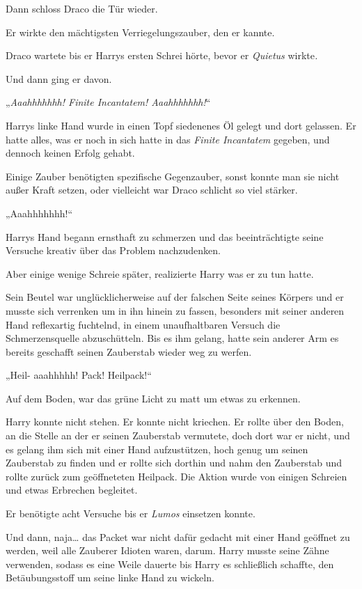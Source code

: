 {Dann schloss Draco die Tür wieder.

Er wirkte den mächtigsten Verriegelungszauber, den er kannte.

Draco wartete bis er Harrys ersten Schrei hörte, bevor er \emph{Quietus} wirkte\emph{.}

Und dann ging er davon.

„\emph{Aaahhhhhhh! Finite Incantatem! Aaahhhhhhh!}“

Harrys linke Hand wurde in einen Topf siedenenes Öl gelegt und dort gelassen. Er hatte alles, was er noch in sich hatte in das \emph{Finite Incantatem} gegeben, und dennoch keinen Erfolg gehabt.

Einige Zauber benötigten spezifische Gegenzauber, sonst konnte man sie nicht außer Kraft setzen, oder vielleicht war Draco schlicht so viel stärker.

„Aaahhhhhhh!“

Harrys Hand begann ernsthaft zu schmerzen und das beeinträchtigte seine Versuche kreativ über das Problem nachzudenken.

Aber einige wenige Schreie später, realizierte Harry was er zu tun hatte.

Sein Beutel war unglücklicherweise auf der falschen Seite seines Körpers und er musste sich verrenken um in ihn hinein zu fassen, besonders mit seiner anderen Hand reflexartig fuchtelnd, in einem unaufhaltbaren Versuch die Schmerzensquelle abzuschütteln. Bis es ihm gelang, hatte sein anderer Arm es bereits geschafft seinen Zauberstab wieder weg zu werfen.

„Heil- aaahhhhh! Pack! Heilpack!“

Auf dem Boden, war das grüne Licht zu matt um etwas zu erkennen.

Harry konnte nicht stehen. Er konnte nicht kriechen. Er rollte über den Boden, an die Stelle an der er seinen Zauberstab vermutete, doch dort war er nicht, und es gelang ihm sich mit einer Hand aufzustützen, hoch genug um seinen Zauberstab zu finden und er rollte sich dorthin und nahm den Zauberstab und rollte zurück zum geöffneteten Heilpack. Die Aktion wurde von einigen Schreien und etwas Erbrechen begleitet.

Er benötigte acht Versuche bis er \emph{Lumos} einsetzen konnte.

Und dann, naja… das Packet war nicht dafür gedacht mit einer Hand geöffnet zu werden, weil alle Zauberer Idioten waren, darum. Harry musste seine Zähne verwenden, sodass es eine Weile dauerte bis Harry es schließlich schaffte, den Betäubungsstoff um seine linke Hand zu wickeln.

}
